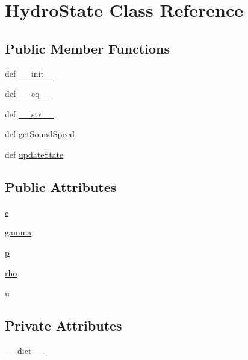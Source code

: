 \hypertarget{classsrc_1_1_muscl_hanc_1_1_hydro_state}{\section{Hydro\-State Class Reference}
\label{classsrc_1_1_muscl_hanc_1_1_hydro_state}
}
\subsection*{Public Member Functions}
\begin{DoxyCompactItemize}
\item 
def \hyperlink{classsrc_1_1_muscl_hanc_1_1_hydro_state_ac775ee34451fdfa742b318538164070e}{\-\_\-\-\_\-init\-\_\-\-\_\-}
\item 
def \hyperlink{classsrc_1_1_muscl_hanc_1_1_hydro_state_a449f8fd74d358c0ad641b6c6d6917ba0}{\-\_\-\-\_\-eq\-\_\-\-\_\-}
\item 
def \hyperlink{classsrc_1_1_muscl_hanc_1_1_hydro_state_aa7a4b9bc0941308e362738503137460e}{\-\_\-\-\_\-str\-\_\-\-\_\-}
\item 
def \hyperlink{classsrc_1_1_muscl_hanc_1_1_hydro_state_aaaef2d0d9f0d8ae2018f145248ffcf8f}{get\-Sound\-Speed}
\item 
def \hyperlink{classsrc_1_1_muscl_hanc_1_1_hydro_state_a5bcd76e987be8143f8a814c7d47276ff}{update\-State}
\end{DoxyCompactItemize}
\subsection*{Public Attributes}
\begin{DoxyCompactItemize}
\item 
\hyperlink{classsrc_1_1_muscl_hanc_1_1_hydro_state_a08a4415e9d594ff960030b921d42b91e}{e}
\item 
\hyperlink{classsrc_1_1_muscl_hanc_1_1_hydro_state_a8d00631c9622112f1877fdb1222c242e}{gamma}
\item 
\hyperlink{classsrc_1_1_muscl_hanc_1_1_hydro_state_ac483f6ce851c9ecd9fb835ff7551737c}{p}
\item 
\hyperlink{classsrc_1_1_muscl_hanc_1_1_hydro_state_ab8ec92cc3ea8422c9349409bae98d2a0}{rho}
\item 
\hyperlink{classsrc_1_1_muscl_hanc_1_1_hydro_state_a6277e2a7446059985dc9bcf0a4ac1a8f}{u}
\end{DoxyCompactItemize}
\subsection*{Private Attributes}
\begin{DoxyCompactItemize}
\item 
\hyperlink{classsrc_1_1_muscl_hanc_1_1_hydro_state_ae55534cfed72fbc20108277a88fdc073}{\-\_\-\-\_\-dict\-\_\-\-\_\-}
\end{DoxyCompactItemize}


